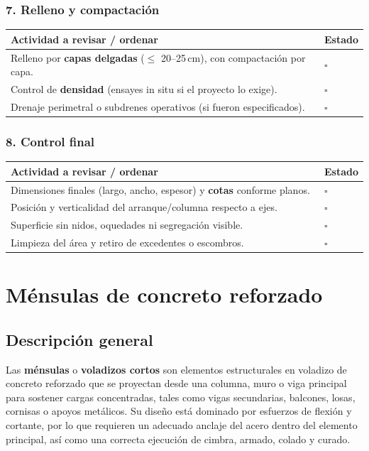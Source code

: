 \documentclass[12pt]{article}
\newcommand{\cbox}{\(\square\)} %
\begin{document}
	\subsubsection*{7. Relleno y compactación}
	\begin{tabularx}{\linewidth}{>{\raggedright\arraybackslash}p{0.93\linewidth} >{\centering\arraybackslash}m{0.07\linewidth}}
		\toprule
		\textbf{Actividad a revisar / ordenar} & \textbf{Estado}\\
		\midrule
		Relleno por \textbf{capas delgadas} (\(\leq\) 20--25\,cm), con compactación por capa. & \cbox \\
		Control de \textbf{densidad} (ensayes in situ si el proyecto lo exige). & \cbox \\
		Drenaje perimetral o subdrenes operativos (si fueron especificados). & \cbox \\
		\bottomrule
	\end{tabularx}
	
	\subsubsection*{8. Control final}
	\begin{tabularx}{\linewidth}{>{\raggedright\arraybackslash}p{0.93\linewidth} >{\centering\arraybackslash}m{0.07\linewidth}}
		\toprule
		\textbf{Actividad a revisar / ordenar} & \textbf{Estado}\\
		\midrule
		Dimensiones finales (largo, ancho, espesor) y \textbf{cotas} conforme planos. & \cbox \\
		Posición y verticalidad del arranque/columna respecto a ejes. & \cbox \\
		Superficie sin nidos, oquedades ni segregación visible. & \cbox \\
		Limpieza del área y retiro de excedentes o escombros. & \cbox \\
		\bottomrule
	\end{tabularx}
	
	
	
	
	
	
	\section{Ménsulas de concreto reforzado}
	
	\subsection*{Descripción general}
	Las \textbf{ménsulas} o \textbf{voladizos cortos} son elementos estructurales en voladizo de concreto reforzado que se proyectan desde una columna, muro o viga principal para sostener cargas concentradas, tales como vigas secundarias, balcones, losas, cornisas o apoyos metálicos.  
	Su diseño está dominado por esfuerzos de flexión y cortante, por lo que requieren un adecuado anclaje del acero dentro del elemento principal, así como una correcta ejecución de cimbra, armado, colado y curado.
	
\end{document}

